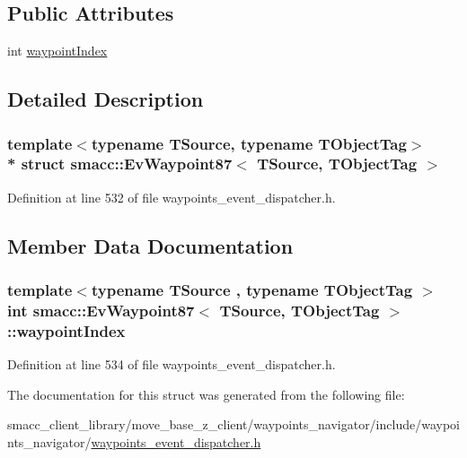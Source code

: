 \subsection*{Public Attributes}
\begin{DoxyCompactItemize}
\item 
int \hyperlink{structsmacc_1_1EvWaypoint87_ac61b8abce114969c63380e80993e9bf2}{waypoint\+Index}
\end{DoxyCompactItemize}


\subsection{Detailed Description}
\subsubsection*{template$<$typename T\+Source, typename T\+Object\+Tag$>$\\*
struct smacc\+::\+Ev\+Waypoint87$<$ T\+Source, T\+Object\+Tag $>$}



Definition at line 532 of file waypoints\+\_\+event\+\_\+dispatcher.\+h.



\subsection{Member Data Documentation}
\subsubsection[{\texorpdfstring{waypoint\+Index}{waypointIndex}}]{\setlength{\rightskip}{0pt plus 5cm}template$<$typename T\+Source , typename T\+Object\+Tag $>$ int {\bf smacc\+::\+Ev\+Waypoint87}$<$ T\+Source, T\+Object\+Tag $>$\+::waypoint\+Index}\hypertarget{structsmacc_1_1EvWaypoint87_ac61b8abce114969c63380e80993e9bf2}{}\label{structsmacc_1_1EvWaypoint87_ac61b8abce114969c63380e80993e9bf2}


Definition at line 534 of file waypoints\+\_\+event\+\_\+dispatcher.\+h.



The documentation for this struct was generated from the following file\+:\begin{DoxyCompactItemize}
\item 
smacc\+\_\+client\+\_\+library/move\+\_\+base\+\_\+z\+\_\+client/waypoints\+\_\+navigator/include/waypoints\+\_\+navigator/\hyperlink{waypoints__event__dispatcher_8h}{waypoints\+\_\+event\+\_\+dispatcher.\+h}\end{DoxyCompactItemize}
